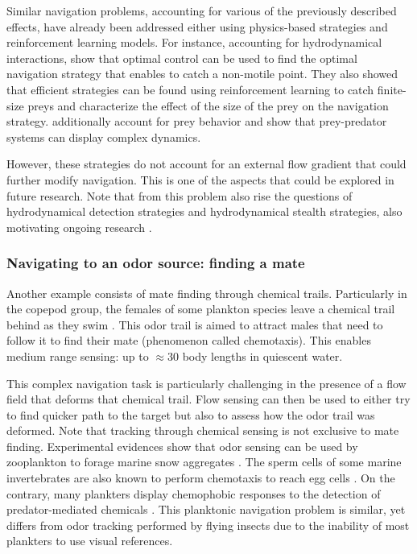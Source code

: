 Similar navigation problems, accounting for various of the previously described effects, have already been addressed either using physics-based strategies and reinforcement learning models.
For instance, accounting for hydrodynamical interactions, \citet{zhu2022optimising} show that optimal control can be used to find the optimal navigation strategy that enables to catch a non-motile point. 
They also showed that efficient strategies can be found using reinforcement learning to catch finite-size preys and characterize the effect of the size of the prey on the navigation strategy.
\citet{borra2022reinforcement} additionally account for prey behavior and show that prey-predator systems can display complex dynamics.

However, these strategies do not account for an external flow gradient that could further modify navigation.
This is one of the aspects that could be explored in future research.
Note that from this problem also rise the questions of hydrodynamical detection strategies and hydrodynamical stealth strategies, also motivating ongoing research \citep{ren2021bluff}.

\subsubsection{Navigating to an odor source: finding a mate}

Another example consists of mate finding through chemical trails.
Particularly in the copepod group, the females of some plankton species leave a chemical trail behind as they swim \citep{weissburg1998following, bagoien2005blind, yen2010chemical}.
This odor trail is aimed to attract males that need to follow it to find their mate (phenomenon called chemotaxis).
This enables medium range sensing: up to $\approx 30$ body lengths \citep{bagoien2005blind} in quiescent water.

This complex navigation task is particularly challenging in the presence of a flow field that deforms that chemical trail.
Flow sensing can then be used to either try to find quicker path to the target but also to assess how the odor trail was deformed.
Note that tracking through chemical sensing is not exclusive to mate finding.
Experimental evidences show that odor sensing can be used by zooplankton to forage marine snow aggregates \citep{lombard2013copepods}.
The sperm cells of some marine invertebrates are also known to perform chemotaxis to reach egg cells \citep{lange2021sperm}.
On the contrary, many plankters display chemophobic responses to the detection of predator-mediated chemicals \citep{hay2009marine}.
This planktonic  navigation problem is similar, yet differs from odor tracking performed by flying insects \citep{carde2008navigational, willis2011role} due to the inability of most plankters to use visual references.

